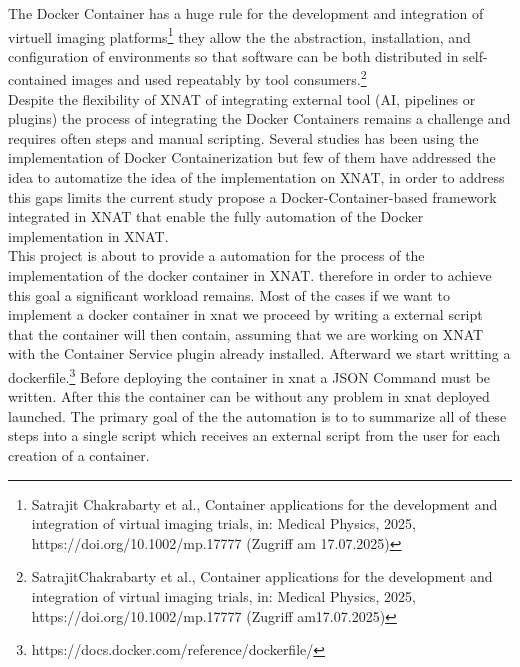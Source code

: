 The Docker Container has a huge rule for the development and integration of virtuell imaging platforms\footnote{Satrajit Chakrabarty et al., Container applications for the development and integration of virtual imaging trials, in: Medical Physics, 2025, https://doi.org/10.1002/mp.17777 (Zugriff am 17.07.2025)} they allow the the abstraction, installation, and configuration of environments so that software can be both distributed in self-contained images and used repeatably by tool consumers.\footnote{SatrajitChakrabarty et al., Container applications for the development and integration of virtual imaging trials, in: Medical Physics, 2025, https://doi.org/10.1002/mp.17777 (Zugriff am17.07.2025)}\\ Despite the flexibility of XNAT of integrating external tool (AI, pipelines or plugins) the process of integrating the Docker Containers remains a challenge and requires often steps and manual scripting. Several studies has been using the implementation  of Docker Containerization but few of them have addressed  the idea to automatize the idea of the implementation on XNAT, in order to address this gaps limits the current study propose a Docker-Container-based framework integrated in XNAT that enable the fully automation of the Docker implementation in XNAT. 
\\
 This project is about  to provide a automation for the process of the implementation of the docker container in XNAT. therefore in order to achieve this goal a significant workload remains.
Most of the cases if we want to implement a docker container in xnat we proceed by writing a external script that the container will then contain, assuming that we are  working on XNAT  with the Container Service plugin already installed. Afterward we start writting a dockerfile.\footnote{https://docs.docker.com/reference/dockerfile/} Before deploying the container in xnat a JSON Command must be written. After this the container can be without any problem in xnat deployed launched. The primary goal of the the automation is to to summarize all of these steps into  a single script which receives an external script from the user for each creation of a container.\\
 


 

